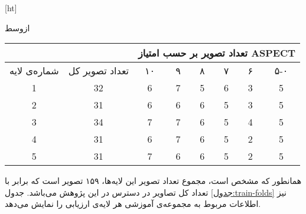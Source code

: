 [ht]

\vspace{1.5em}

‌ازوسط

\begin{tabular}{cccccccc}
    \cline{3-8}
                                                               &                                        & \multicolumn{6}{c}{تعداد تصویر بر حسب امتیاز ASPECT}                                                                                \\ \hline
     
    {شماره‌ی لایه} & تعداد تصویر کل & {۱۰} & {۹} & {۸} & {۷} & {۶} & ۵-۰ \\ \hline
    {1}                                    & 32                                     & {6}                          & {7}                         & {5}                         & {6}                         & {3}                         & 5   \\ 
    {2}                                    & 31                                     & {6}                          & {6}                         & {6}                         & {5}                         & {3}                         & 5   \\ 
    {3}                                    & 34                                     & {7}                          & {7}                         & {6}                         & {5}                         & {4}                         & 5   \\ 
    {4}                                    & 31                                     & {6}                          & {7}                         & {6}                         & {5}                         & {2}                         & 5   \\ 
    {5}                                    & 31                                     & {7}                          & {6}                         & {6}                         & {5}                         & {2}                         & 5   \\ \hline
    \end{tabular}


همانطور که مشخص است، مجموع تعداد تصویر این لایه‌ها، ۱۵۹ تصویر است که برابر با تعداد کل تصاویر در دسترس در این پژوهش می‌باشد.
جدول \ref{جدول:train-folds} نیز
اطلاعات مربوط به مجموعه‌ی آموزشی هر لایه‌ی ارزیابی را نمایش می‌دهد.


